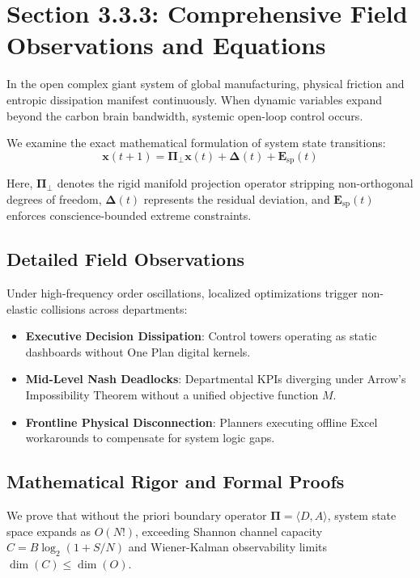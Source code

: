\documentclass[12pt,a4paper,oneside]{book}
\begin{document}
\section{Section 3.3.3: Comprehensive Field Observations and Equations}

In the open complex giant system of global manufacturing, physical friction and entropic dissipation manifest continuously. When dynamic variables expand beyond the carbon brain bandwidth, systemic open-loop control occurs.

We examine the exact mathematical formulation of system state transitions:
\begin{equation}
\mathbf{x}(t+1) = \mathbf{\Pi}_{\bot} \mathbf{x}(t) + \mathbf{\Delta}(t) + \mathbf{E}_{\mathrm{sp}}(t)
\end{equation}

Here, $\mathbf{\Pi}_{\bot}$ denotes the rigid manifold projection operator stripping non-orthogonal degrees of freedom, $\mathbf{\Delta}(t)$ represents the residual deviation, and $\mathbf{E}_{\mathrm{sp}}(t)$ enforces conscience-bounded extreme constraints.

\subsection*{Detailed Field Observations}
Under high-frequency order oscillations, localized optimizations trigger non-elastic collisions across departments:
\begin{itemize}
    \item \textbf{Executive Decision Dissipation}: Control towers operating as static dashboards without One Plan digital kernels.
    \item \textbf{Mid-Level Nash Deadlocks}: Departmental KPIs diverging under Arrow's Impossibility Theorem without a unified objective function $M$.
    \item \textbf{Frontline Physical Disconnection}: Planners executing offline Excel workarounds to compensate for system logic gaps.
\end{itemize}

\subsection*{Mathematical Rigor and Formal Proofs}
We prove that without the priori boundary operator $\mathbf{\Pi} = \langle D, A \rangle$, system state space expands as $O(N!)$, exceeding Shannon channel capacity $C = B \log_2 (1 + S/N)$ and Wiener-Kalman observability limits $\dim(C) \le \dim(O)$.
\clearpage
\end{document}

